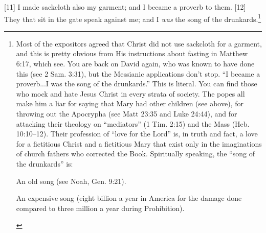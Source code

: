 [11] \textcolor[rgb]{0.00,0.00,1.00}{I made sackcloth also my garment; and I became a proverb to them.}
[12] \textcolor[rgb]{0.00,0.00,1.00}{They that sit in the gate speak against me; and I \emph{was} the song of the drunkards.}\footnote{Most of the expositors agreed that Christ did not use sackcloth for a garment, and this is pretty obvious from His instructions about fasting in Matthew 6:17, which see. You are back on David again, who was known to have done this (see 2 Sam. 3:31), but the Messianic applications don’t stop. “I became a proverb...I was the song of the drunkards.” This is literal. You can find those who mock and hate Jesus Christ in every strata of society. The popes all make him a liar for saying that Mary had other children (see above), for throwing out the Apocrypha (see Matt 23:35 and Luke 24:44), and for attacking their theology on “mediators” (1 Tim. 2:15) and the Mass (Heb. 10:10--12). Their profession of “love for the Lord” is, in truth and fact, a love for a fictitious Christ and a fictitious Mary that exist only in the imaginations of church fathers who corrected the Book. Spiritually speaking, the “song of the drunkards” is: \cite{Ruckman1992Psalms} 
\begin{compactenum}
\item An old song (see Noah, Gen. 9:21).
\item An expensive song (eight billion a year in America for the damage done compared to three million a year during Prohibition).

\end{compactenum}}
